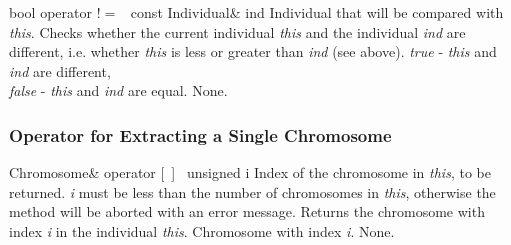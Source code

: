 \setConstInstance
\printMethodWithOneParam
{bool}
{operator $!=$\ }
{const Individual\&}
{ind}
{Individual that will be compared with {\em this}.} 
{Checks whether the current individual {\em this} and the
 individual {\em ind} are different, i.e. whether
 {\em this} is less or greater than {\em ind} (see above).}
{
 {\em true}  - {\em this} and {\em ind} are different,\\
 {\em false} - {\em this} and {\em ind} are equal.}
{None.}

\subsubsection{Operator for Extracting a Single Chromosome}

\setNormalInstance
\printMethodWithOneParam
{Chromosome\&}
{operator [\ ]\ }
{unsigned}
{i}
{Index of the chromosome in {\em this}, to be returned.
 {\em i} must be less than the number of chromosomes in {\em this},
 otherwise the method will be aborted with an error message.}
{Returns the chromosome with index {\em i} in the individual {\em this}.}
{Chromosome with index {\em i}.}
{None.}




